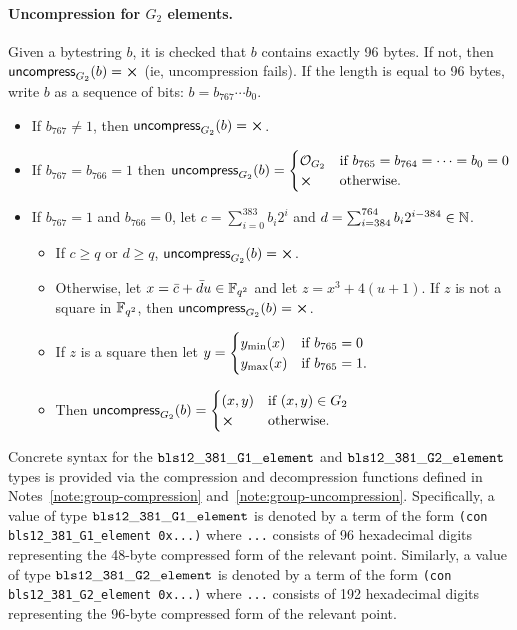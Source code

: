 \paragraph{Uncompression for $G_2$ elements.}  Given a bytestring $b$, it is checked that
$b$ contains exactly 96 bytes.  If not, then $\uncompress_{G_2}(b) = \errorX$ (ie,
uncompression fails).  If the length is equal to 96 bytes, write $b$ as a
sequence of bits: $b = b_{767} \cdots b_0$.
\begin{itemize}
\item If $b_{767} \neq 1$, then $\uncompress_{G_2}(b) = \errorX$.
\item If $b_{767} = b_{766} = 1$ then $\uncompress_{G_2}(b) =
\begin{cases}
\mathcal{O}_{G_2} & \text{if $b_{765} = b_{764} = \cdots = b_0 = 0$}\\
\errorX & \text{otherwise}.
\end{cases}$
\item If $b_{767}=1$ and $b_{766} = 0$, let $c=\sum_{i=0}^{383}b_i2^i$ and $d=\sum_{i=384}^{764}b_i2^{i-384} \in \mathbb{N}$.
\begin{itemize}
\item If $c \geq q$ or $d \geq q$, $\uncompress_{G_2}(b) = \errorX$.
\item Otherwise, let $x = \bar{c}+\bar{d}u \in \mathbb{F}_{q^2}$ and let $z = x^3+4(u+1)$.
If $z$ is not a square in $\mathbb{F}_{q^2}$, then $\uncompress_{G_2}(b) = \errorX$.
\item If $z$ is a square then let
$y=\begin{cases}
y_{\text{min}}(x) & \text{if $b_{765}=0$}\\
y_{\text{max}}(x) & \text{if $b_{765}=1$}.
\end{cases}$
\item Then $\uncompress_{G_2}(b) = \begin{cases}
(x,y) & \text{if $(x,y) \in G_2$}\\
\errorX & \text{otherwise}.
\end{cases}$
\end{itemize}
\end{itemize}


\label{note:bls-syntax}
Concrete syntax for the $\mathtt{bls12\_381\_G1\_element}$ and
$\mathtt{bls12\_381\_G2\_element}$ types is provided via the compression and
decompression functions defined in Notes~\ref{note:group-compression}
and~\ref{note:group-uncompression}.  Specifically, a value of type
$\mathtt{bls12\_381\_G1\_element}$ is denoted by a term of the form \texttt{(con
bls12\_381\_G1\_element 0x...)} where \texttt{...}  consists of 96 hexadecimal
digits representing the 48-byte compressed form of the relevant point.
Similarly, a value of type $\mathtt{bls12\_381\_G2\_element}$ is denoted by a term
of the form \texttt{(con bls12\_381\_G2\_element 0x...)}  where \texttt{...}
consists of 192 hexadecimal digits representing the 96-byte compressed form of
the relevant point.

